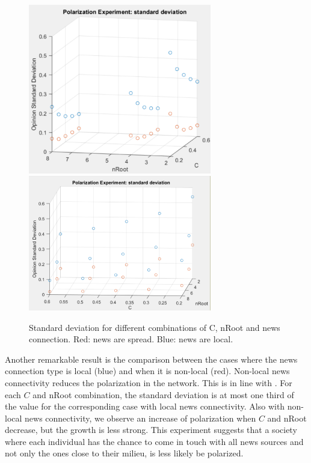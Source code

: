 \begin{figure}
\centering
\includegraphics[width=8cm]{Figures/pol_std1.png}
\includegraphics[width=8cm]{Figures/pol_std2.png}
\caption{Standard deviation for different combinations of C, nRoot and news connection. Red: news are spread. Blue: news are local.}
\label{pics:pol_std}
\end{figure}


Another remarkable result is the comparison between the cases where the news connection type is local (blue) and when it is non-local (red). Non-local news connectivity reduces the polarization in the network. This is in line with \cite{Lee2014a}.
For each $C$ and nRoot combination, the standard deviation is at most one third of the value for the corresponding case with local news connectivity. Also with non-local news connectivity, we observe an increase of polarization when $C$ and nRoot decrease, but the growth is less strong. This experiment suggests that a society where each individual has the chance to come in touch with all news sources and not only the ones close to their milieu, is less likely be polarized.

